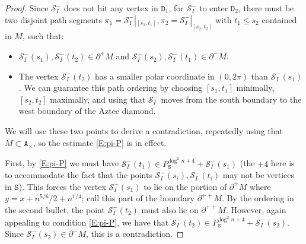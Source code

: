 \documentclass[10pt,a4paper]{amsart}
\newcommand{\cS}{\mathcal{S}}
\renewcommand{\tt}[1]{{\mathtt{#1}}}
\begin{document}
\begin{proof}
		Since $\cS_I^-$ does not hit any vertex in $\tt{D}_1$, for $\cS_I^-$ to enter $\tt{D}_2$, there must be two disjoint path segments $\pi_1 = \cS_I^-|_{[s_1, t_1]}, \pi_2 = \cS_I^-|_{[s_2, t_2]}$ with $t_1 \le s_2$ contained in $M$, such that:
		\begin{itemize}
			\item $\cS_I^-(s_1), \cS_I^-(t_2) \in \partial^+ M$ and $\cS_I^-(s_2), \cS_I^-(t_1) \in \partial^- M$.
			\item The vertex $\cS_I^-(t_2)$ has a smaller polar coordinate in $(0, 2 \pi)$ than $\cS_I^-(s_1)$. We can guarantee this path ordering by choosing $[s_1, t_1]$ minimally, $[s_2, t_2]$ maximally, and using that $\cS_I^-$ moves from the south boundary to the west boundary of the Aztec diamond.
		\end{itemize}
		We will use these two points to derive a contradiction,  repeatedly using that $M \subset \tt{A}_\times$, so the estimate \eqref{E:pi-P} is in effect.
		
		First, by \eqref{E:pi-P} we must have $\cS_I^-(t_1) \in P_\tt{S}^{\log^2 n + 4} + \cS_I^-(s_1)$ (the $+ 4$ here is to accommodate the fact that the points $\cS_I^-(s_i), \cS_I^-(t_i)$ may not be vertices in $\tt{S}$). This forces the vertex $\cS_I^-(s_1)$ to lie on the portion of $\partial^{+} M$ where $y = x + n^{5/6}/2 + n^{1/4}$; call this part of the boundary $\partial^{++} M$. By the ordering in the second bullet, the point $\cS_I^-(t_2)$ must also lie on $\partial^{++} M$. However, again appealing to condition \eqref{E:pi-P}, we have that $\cS_I^-(t_2) \in P_\tt{S}^{\log^2 n + 4} + \cS_I^-(s_2)$. Since $\cS_I^-(s_2) \in \partial^- M$, this is a contradiction.
	\end{proof}
\end{document}
